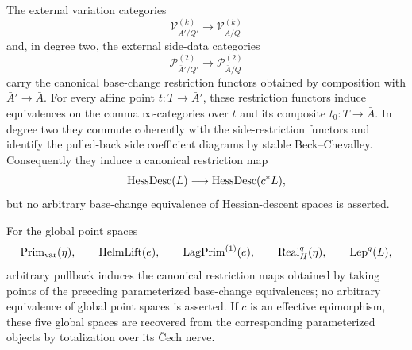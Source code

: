\begin{theorem}
The external variation categories
\[
    \mathcal V^{(k)}_{\bar A'/Q'}
    \longrightarrow
    \mathcal V^{(k)}_{\bar A/Q}
\]
and, in degree two, the external side-data categories
\[
    \mathcal P^{(2)}_{\bar A'/Q'}
    \longrightarrow
    \mathcal P^{(2)}_{\bar A/Q}
\]
carry the canonical base-change restriction functors obtained by composition with \(\bar A'\to\bar A\). For every affine point \(t:T\to\bar A'\), these restriction functors induce equivalences on the comma \(\infty\)-categories over \(t\) and its composite \(t_0:T\to\bar A\). In degree two they commute coherently with the side-restriction functors and identify the pulled-back side coefficient diagrams by stable Beck--Chevalley. Consequently they induce a canonical restriction map
\[
    \operatorname{HessDesc}(L)
    \longrightarrow
    \operatorname{HessDesc}(c^*L),
\]
but no arbitrary base-change equivalence of Hessian-descent spaces is asserted.

For the global point spaces
\[
    \operatorname{Prim}_{\mathrm{var}}(\eta),\qquad
    \operatorname{HelmLift}(e),\qquad
    \operatorname{LagPrim}^{(1)}(e),\qquad
    \operatorname{Real}_{H}^q(\eta),\qquad
    \operatorname{Lep}^q(L),
\]
arbitrary pullback induces the canonical restriction maps obtained by taking points of the preceding parameterized base-change equivalences; no arbitrary equivalence of global point spaces is asserted. If \(c\) is an effective epimorphism, these five global spaces are recovered from the corresponding parameterized objects by totalization over its Čech nerve.
\end{theorem}

